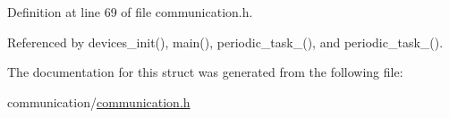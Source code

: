 Definition at line 69 of file communication.\-h.



Referenced by devices\-\_\-init(), main(), periodic\-\_\-task\-\_(), and periodic\-\_\-task\-\_().



The documentation for this struct was generated from the following file\-:\begin{DoxyCompactItemize}
\item 
communication/\hyperlink{communication_2communication_8h}{communication.\-h}\end{DoxyCompactItemize}
